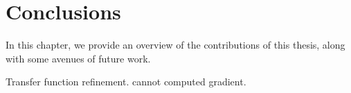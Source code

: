 \chapter{Conclusions \label{conclusions}}

In this chapter, we provide an overview of the contributions of this thesis, along with some avenues of future work.

Transfer function refinement. cannot computed gradient.


